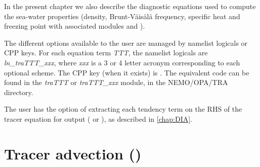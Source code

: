 \documentclass[../main/NEMO_manual]{subfiles}
\begin{document}
In the present chapter we also describe the diagnostic equations used to compute the sea-water properties
(density, Brunt-V\"{a}is\"{a}l\"{a} frequency, specific heat and freezing point with
associated modules  and ).

The different options available to the user are managed by namelist logicals or CPP keys.
For each equation term  \textit{TTT}, the namelist logicals are \textit{ln\_traTTT\_xxx},
where \textit{xxx} is a 3 or 4 letter acronym corresponding to each optional scheme.
The CPP key (when it exists) is .
The equivalent code can be found in the \textit{traTTT} or \textit{traTTT\_xxx} module,
in the NEMO/OPA/TRA directory.

The user has the option of extracting each tendency term on the RHS of the tracer equation for output
( or ), as described in \autoref{chap:DIA}.

\section{Tracer advection (\protect{})}
\label{sec:TRA_adv}

\end{document}
